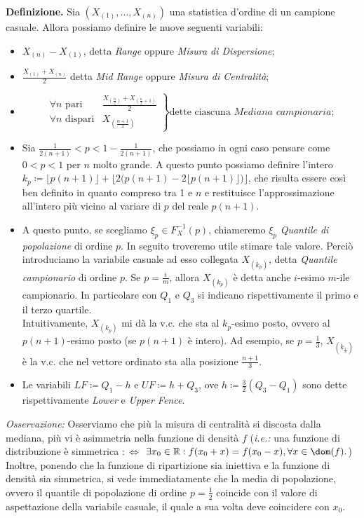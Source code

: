 \textbf{Definizione.} Sia $\left(X_{(1)},\ldots,X_{(n)}\right)$ una statistica d'ordine di un campione casuale. Allora possiamo definire le nuove seguenti variabili:
\begin{itemize}[noitemsep]
\item $X_{(n)}-X_{(1)}$, detta \textit{Range} oppure \textit{Misura di Dispersione};
\item $\frac{X_{(1)}+X_{(n)}}{2}$ detta \textit{Mid Range} oppure \textit{Misura di Centralità};
\item 
$$
\left.
\begin{array}{rl}
\forall n \mbox{ pari} & \frac{X_{(\frac{n}{2})}+X_{(\frac{n}{2}+1)}}{2} \\
\forall n \mbox{ dispari} & X_{(\frac{n+1}{2})}
\end{array}
\right\} \mbox{dette ciascuna }\textit{Mediana campionaria};
$$
\item Sia $\frac{1}{2(n+1)}<p<1-\frac{1}{2(n+1)}$, che possiamo in ogni caso pensare come $0<p<1$ per $n$ molto grande. A questo punto possiamo definire l'intero $k_p\coloneqq \big\lfloor p(n+1) \big\rfloor + \big\lfloor 2\big(p(n+1)- 2 \lfloor p(n+1) \rfloor \big) \big\rfloor$, che risulta essere così ben definito in quanto compreso tra 1 e $n$ e restituisce l'approssimazione all'intero più vicino al variare di $p$ del reale $p(n+1)$. 
\item A questo punto, se scegliamo $\xi_p\in F_X^{-1}(p)$, chiameremo $\xi_p$ \textit{Quantile di popolazione} di ordine $p$. In seguito troveremo utile stimare tale valore. Perciò introduciamo la variabile casuale ad esso collegata $X_{(k_p)}$, detta \textit{Quantile campionario} di ordine $p$. Se $p=\frac{i}{m}$, allora $X_{(k_p)}$ è detta anche $i$-esimo $m$-ile campionario. In particolare con $Q_1$ e $Q_3$ si indicano rispettivamente il primo e il terzo quartile.\\
Intuitivamente, $X_{(k_p)}$ mi dà la v.c. che sta al $k_p$-esimo posto, ovvero al $p(n+1)$-esimo posto (se $p(n+1)$ è intero). Ad esempio, se $p=\frac{1}{3}$, $X_{(k_{\frac{1}{3}})}$ è la v.c. che nel vettore ordinato sta alla posizione $\frac{n+1}{3}$.
\item Le variabili $LF\coloneqq Q_1-h$ e $UF\coloneqq h+Q_3$, ove $h\coloneqq \frac{3}{2}(Q_3-Q_1)$ sono dette rispettivamente \textit{Lower} e \textit{Upper Fence}. 
\end{itemize}
\textit{Osservazione:} Osserviamo che più la misura di centralità si discosta dalla mediana, più vi è asimmetria nella funzione di densità $f$ (\textit{i.e.:} una funzione di distribuzione è simmetrica $:\Longleftrightarrow$ $\exists x_0\in \mathbb{R}:f(x_0+x)=f(x_0-x), \forall x\in \dom(f).$) Inoltre, ponendo che la funzione di ripartizione sia iniettiva e la funzione di densità sia simmetrica, si vede immediatamente che la media di popolazione, ovvero il quantile di popolazione di ordine $p=\frac{1}{2}$ coincide con il valore di aspettazione della variabile casuale, il quale a sua volta deve coincidere con $x_0$. \\ \\
